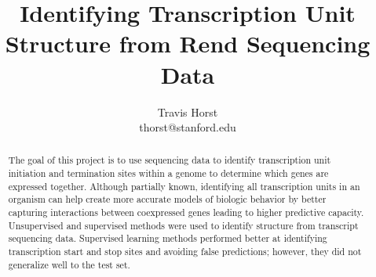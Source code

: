 \documentclass{article}
\title{Identifying Transcription Unit Structure from Rend Sequencing Data}
\author{
  Travis Horst \\
  thorst@stanford.edu
}
\begin{document}

\maketitle

\begin{abstract}
The goal of this project is to use sequencing data to identify transcription unit initiation and termination sites within a genome to determine which genes are expressed together. Although partially known, identifying all transcription units in an organism can help create more accurate models of biologic behavior by better capturing interactions between coexpressed genes leading to higher predictive capacity. Unsupervised and supervised methods were used to identify structure from transcript sequencing data. Supervised learning methods performed better at identifying transcription start and stop sites and avoiding false predictions; however, they did not generalize well to the test set.
\end{abstract}
\end{document}
